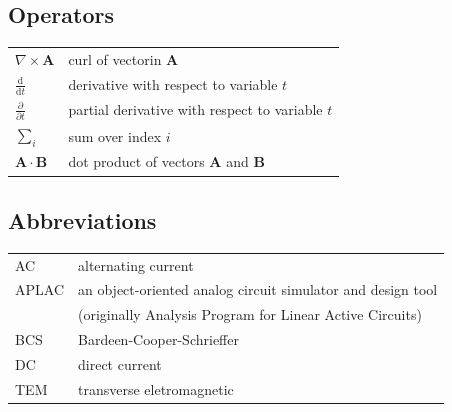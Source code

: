 \documentclass[english,12pt,a4paper,pdftex,elec,utf8]{aaltothesis}
\begin{document}
\subsection*{Operators}

\begin{tabular}{ll}
$\nabla \times \mathbf{A}$              & curl of vectorin $\mathbf{A}$\\
$\displaystyle\frac{\mbox{d}}{\mbox{d} t}$ & derivative with respect to 
variable $t$\\[3mm]
$\displaystyle\frac{\partial}{\partial t}$  & partial derivative with respect 
to variable $t$ \\[3mm]
$\sum_i $                       & sum over index $i$\\
$\mathbf{A} \cdot \mathbf{B}$    & dot product of vectors $\mathbf{A}$ and 
$\mathbf{B}$
\end{tabular}

\subsection*{Abbreviations}

\begin{tabular}{ll}
AC         & alternating current \\
APLAC      & an object-oriented analog circuit simulator and design tool \\
           & (originally Analysis Program for Linear Active Circuits) \\
BCS        & Bardeen-Cooper-Schrieffer \\ %
DC         & direct current \\
TEM        & transverse eletromagnetic
\end{tabular}


\cleardoublepage
\storeinipagenumber
{}
\setcounter{page}{1}


\end{document}
